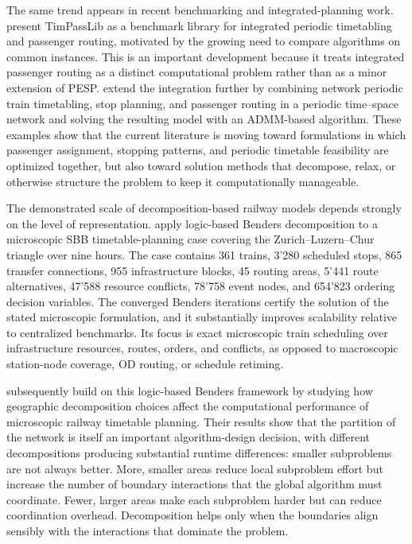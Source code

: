 \documentclass[preprint,12pt]{elsarticle}
\begin{document}
The same trend appears in recent benchmarking and integrated-planning work. \citet{schieweGoerigkLindner2023TimPassLib} present TimPassLib as a benchmark library for integrated periodic timetabling and passenger routing, motivated by the growing need to compare algorithms on common instances. This is an important development because it treats integrated passenger routing as a distinct computational problem rather than as a minor extension of PESP. \citet{yaoEtAl2023IntegratedStopPlanning} extend the integration further by combining network periodic train timetabling, stop planning, and passenger routing in a periodic time--space network and solving the resulting model with an ADMM-based algorithm. These examples show that the current literature is moving toward formulations in which passenger assignment, stopping patterns, and periodic timetable feasibility are optimized together, but also toward solution methods that decompose, relax, or otherwise structure the problem to keep it computationally manageable.

The demonstrated scale of decomposition-based railway models depends strongly on the level of representation. \citet{leutwilerCorman2022LogicBenders} apply logic-based Benders decomposition to a microscopic SBB timetable-planning case covering the Zurich--Luzern--Chur triangle over nine hours. The case contains 361 trains, 3’280 scheduled stops, 865 transfer connections, 955 infrastructure blocks, 45 routing areas, 5’441 route alternatives, 47’588 resource conflicts, 78’758 event nodes, and 654’823 ordering decision variables. The converged Benders iterations certify the solution of the stated microscopic formulation, and it substantially improves scalability relative to centralized benchmarks. Its focus is exact microscopic train scheduling over infrastructure resources, routes, orders, and conflicts, as opposed to macroscopic station-node coverage, OD routing, or schedule retiming. 

\citet{trepatBoreckaEtAl2025Geographic} subsequently build on this logic-based Benders framework by studying how geographic decomposition choices affect the computational performance of microscopic railway timetable planning. Their results show that the partition of the network is itself an important algorithm-design decision, with different decompositions producing substantial runtime differences: smaller subproblems are not always better. More, smaller areas reduce local subproblem effort but increase the number of boundary interactions that the global algorithm must coordinate. Fewer, larger areas make each subproblem harder but can reduce coordination overhead. Decomposition helps only when the boundaries align sensibly with the interactions that dominate the problem.
\end{document}
